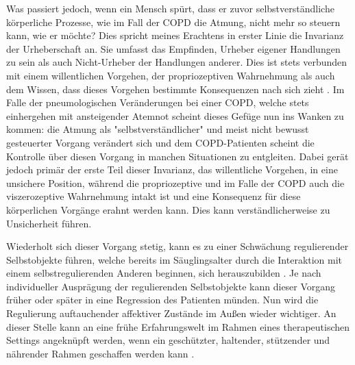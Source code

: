 Was passiert jedoch, wenn ein Mensch spürt, dass er zuvor selbstverständliche körperliche Prozesse, wie im Fall der COPD die Atmung, nicht mehr so steuern kann, wie er möchte? Dies spricht meines Erachtens in erster Linie die Invarianz der Urheberschaft an. Sie umfasst das Empfinden, Urheber eigener Handlungen zu sein als auch Nicht-Urheber der Handlungen anderer. Dies ist stets verbunden mit einem willentlichen Vorgehen, der propriozeptiven Wahrnehmung als auch dem Wissen, dass dieses Vorgehen bestimmte Konsequenzen nach sich zieht \autocite[vgl.][106, 114f.]{stern2007}. Im Falle der pneumologischen Veränderungen bei einer COPD, welche stets einhergehen mit ansteigender Atemnot scheint dieses Gefüge nun ins Wanken zu kommen: die Atmung als "selbstverständlicher" und meist nicht bewusst gesteuerter Vorgang verändert sich und dem COPD-Patienten scheint die Kontrolle über diesen Vorgang in manchen Situationen zu entgleiten. Dabei gerät jedoch primär der erste Teil dieser Invarianz, das willentliche Vorgehen, in eine unsichere Position, während die propriozeptive und im Falle der COPD auch die viszerozeptive Wahrnehmung intakt ist und eine Konsequenz für diese körperlichen Vorgänge erahnt werden kann. Dies kann verständlicherweise zu Unsicherheit führen.

Wiederholt sich dieser Vorgang stetig, kann es zu einer Schwächung regulierender Selbstobjekte führen, welche bereits im Säuglingsalter durch die Interaktion mit einem selbstregulierenden Anderen beginnen, sich herauszubilden \autocite[vgl.][338f.]{stern2007}. Je nach individueller Ausprägung der regulierenden Selbstobjekte kann dieser Vorgang früher oder später in eine Regression des Patienten münden. Nun wird die Regulierung auftauchender affektiver Zustände im Außen wieder wichtiger. 
An dieser Stelle kann an eine frühe Erfahrungswelt im Rahmen eines therapeutischen Settings angeknüpft werden, wenn ein geschützter, haltender, stützender und nährender Rahmen geschaffen werden kann \autocite[vgl.][8ff.]{decker-voigt2008}.

